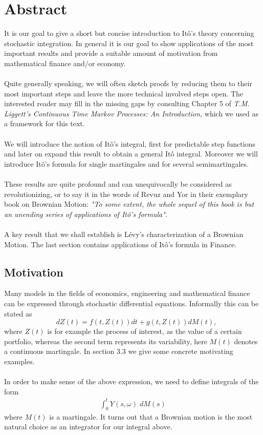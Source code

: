 \documentclass[11pt,a4paper, final]{article}
\begin{document}
\section{Abstract}
It is our goal to give a short but concise introduction to Itô's theory concerning stochastic integration. In general it is our goal to show applications of the most important results and provide a suitable amount of motivation from mathematical finance and/or economy. 
\\\\
Quite generally speaking, we will often sketch proofs by reducing them to their most important steps and leave the more technical involved steps open. The interested reader may fill in the missing gaps by consulting  Chapter 5 of \textit{T.M. Liggett's Continuous Time Markov Processes: An Introduction,} which we used as a framework for this text. 
\\\\
We will introduce the notion of Itô's integral, first for predictable step functions and later on expand this result to obtain a general Itô integral. Moreover we will introduce Itô's formula for single martingales and for several semimartingales.
\\\\
\noindent These results are quite profound and can unequivocally be considered as revolutionizing, or to say it in the words of Revuz and Yor in their exemplary book on Brownian Motion: \textit{"To some extent, the whole sequel of this book is but an unending series of applications of Itô's formula"}.
\\\\
A key result that we shall establish is Lévy's characterization of a Brownian Motion. The last section contains applications of Itô's formula in Finance. 
\subsection{Motivation}
\noindent Many models in the fields of economics, engineering and mathematical finance can be expressed through stochastic differential equations. Informally this can be stated as
$$ \quad dZ(t) = f(t, Z(t))dt + g(t,Z(t)) dM(t), $$
where $Z(t)$ is for example the process of interest, as the value of a certain portfolio, whereas the second term represents its variability, here $M(t)$ denotes a continuous martingale. In section 3.3 we give some concrete motivating examples. \\
\\
In order to make sense of the above expression, we need to define integrals of the form
\begin{align*} \int_0^t Y(s,\omega) \; dM(s) \tag{$\star$} 
\end{align*}
where $M(t)$ is a martingale. It turns out that a Brownian motion is the most natural choice as an integrator for our integral above. 
\newpage 
\end{document}
